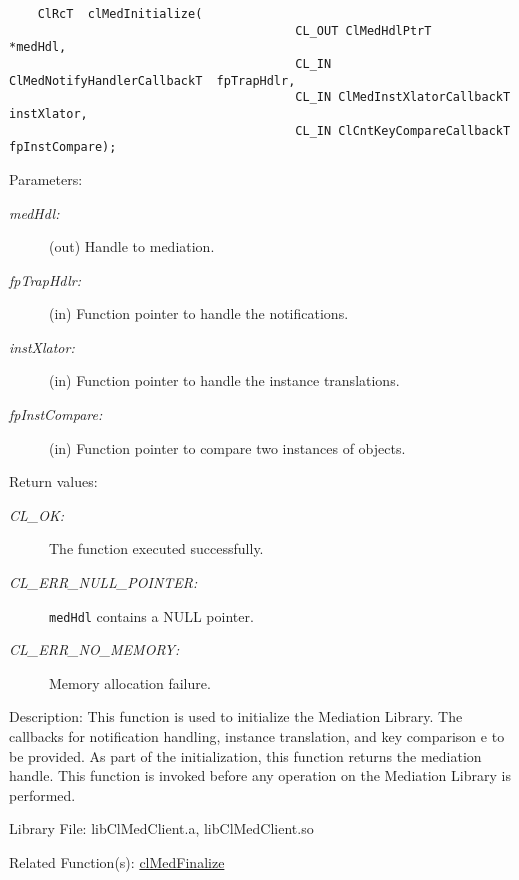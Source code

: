 \begin{flushleft}
\begin{Desc}
\footnotesize\begin{verbatim}    ClRcT  clMedInitialize(
                             			CL_OUT ClMedHdlPtrT       *medHdl,
                             			CL_IN ClMedNotifyHandlerCallbackT  fpTrapHdlr,
                             			CL_IN ClMedInstXlatorCallbackT  instXlator,
                             			CL_IN ClCntKeyCompareCallbackT fpInstCompare);
\end{verbatim}
\normalsize
\end{Desc}
\begin{Desc}
\item[Parameters:]
\begin{description}
\item[{\em med\-Hdl:}](out) Handle to mediation. 
\item[{\em fp\-Trap\-Hdlr:}](in) Function pointer to handle the notifications. 
\item[{\em inst\-Xlator:}](in) Function pointer to handle the instance translations. 
\item[{\em fp\-Inst\-Compare:}](in) Function pointer to compare two instances of objects.\end{description}
\end{Desc}
\begin{Desc}
\item[Return values:]
\begin{description}
\item[{\em CL\_\-OK:}]The function executed successfully. 
\item[{\em CL\_\-ERR\_\-NULL\_\-POINTER:}]{\tt{medHdl}} contains a NULL pointer. 
\item[{\em CL\_\-ERR\_\-NO\_\-MEMORY:}]Memory allocation failure.\end{description}
\end{Desc}
\begin{Desc}
\item[Description:]This function is used to initialize the Mediation Library. The callbacks for notification handling, instance translation, and key 
comparison e to be provided. As part of the initialization, this function returns the mediation handle. 
This function is invoked before any operation on the Mediation Library is performed.\end{Desc}
\begin{Desc}
\item[Library File:]lib\-Cl\-Med\-Client.a, lib\-Cl\-Med\-Client.so\end{Desc}
\begin{Desc}
\item[Related Function(s):]\hyperlink{pagemed102}{cl\-Med\-Finalize} \end{Desc}
\newpage



\end{flushleft}
